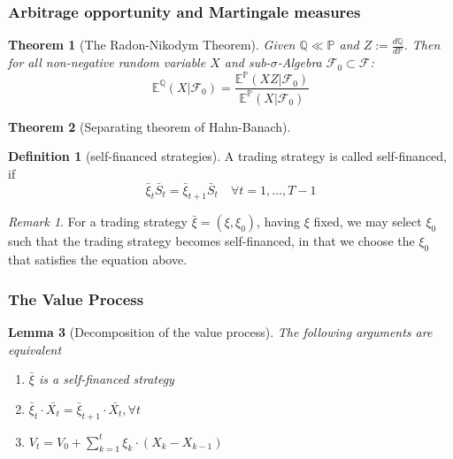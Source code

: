 \documentclass[a4paper,11pt]{book}
\newtheorem{theorem}{Theorem}[section]
\newtheorem{lemma}[theorem]{Lemma}
\theoremstyle{definition}
\newtheorem{definition}{Definition}[section]
\theoremstyle{remark}
\newtheorem*{remark}{Remark}
\begin{document}
\subsubsection{Arbitrage opportunity and Martingale measures}
\begin{theorem}[The Radon-Nikodym Theorem]
	Given $\mathbb{Q} \ll \mathbb{P}$ and $Z := \frac{d\mathbb{Q}}{d\mathbb{P}}$. Then for all non-negative random variable $X$ and sub-$\sigma$-Algebra $\mathcal{F}_0 \subset \mathcal{F}$:
	\begin{equation*}
		\mathbb{E}^{\mathbb{Q}}(X|\mathcal{F}_0) =\frac{\mathbb{E}^{\mathbb{P}}(XZ|\mathcal{F}_0)}{\mathbb{E}^{\mathbb{P}}(X|\mathcal{F}_0)}  
	\end{equation*}
\end{theorem}

\begin{theorem}[Separating theorem of Hahn-Banach]
\end{theorem}

\begin{definition}[self-financed strategies]
	A trading strategy is called self-financed, if
	\begin{equation*}
		\bar{\xi}_t \bar{S}_t = \bar{\xi}_{t+1} \bar{S}_t \quad \forall t = 1, \dots, T-1
	\end{equation*}
\end{definition}
\begin{remark}
For a trading strategy $\bar{\xi} = (\xi, \xi_0)$, having $\xi$ fixed, we may select $\xi_0$ such that the trading strategy becomes self-financed, in that we choose the $\xi_0$ that satisfies the equation above.  
\end{remark}

\subsubsection*{The Value Process}


\begin{lemma}[Decomposition of the value process]
	The following arguments are equivalent
	\begin{enumerate}
		\item $\bar{\xi}$ is a self-financed strategy
		\item $\bar{\xi}_t \cdot \bar{X_t} = \bar{\xi}_{t + 1} \cdot \bar{X_t}, \forall t$
		\item $V_t = V_0 + \sum_{k = 1}^t \xi_k \cdot (X_k - X_{k - 1})$
	\end{enumerate}
\end{lemma}
\end{document}
